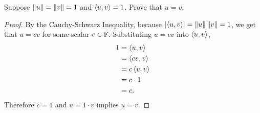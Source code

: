 Suppose $\left\| {u} \right\| = \left\| {v} \right\| = 1$ and $\left\langle{u,v}\right\rangle = 1$.  Prove that $u = v$.
\begin{mybox}
    \begin{proof}
        By the Cauchy-Schwarz Inequality, because $\left| {\left\langle{u,v}\right\rangle} \right| = \left\| {u} \right\| \left\| {v} \right\| = 1$, we get that $u = cv$ for some scalar $c \in \mathbb{F}$. Substituting $u = cv$ into $\left\langle{u,v}\right\rangle$,
        \begin{align*}
            1 &= \left\langle{u,v}\right\rangle \\ &= \left\langle{cv,v}\right\rangle\\
            &= c \left\langle{v,v}\right\rangle\\
            &= c \cdot 1 \\
            &= c.
        \end{align*}
        Therefore $c = 1$ and $u = 1 \cdot v$ implies $u = v$.
    \end{proof}
\end{mybox}